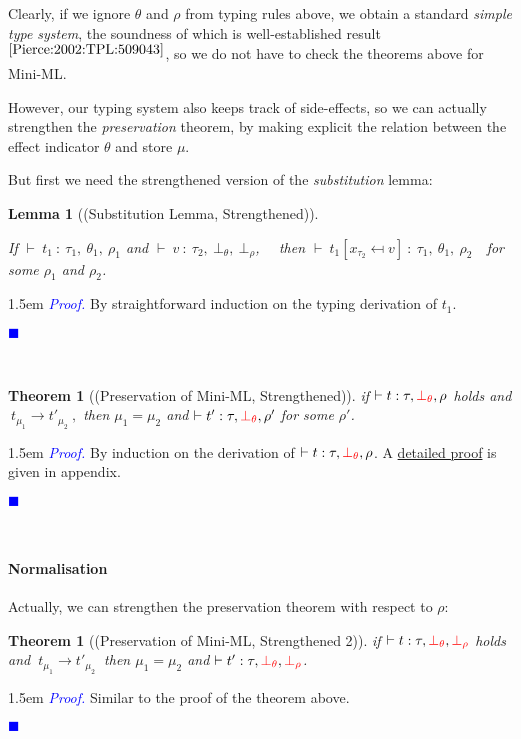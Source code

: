 \documentclass[a4paper,11pt,oneside]{article}
\theoremstyle{plain}
\newtheorem{lemma}[definition]{Lemma}
\newtheorem{theorem}[definition]{Theorem}
\renewenvironment{proof}{\noindent \begin{adjustwidth}{1.5em}{} \textcolor{blue}{\textit{Proof.}}}
{{\begin{tiny}\textcolor{blue}{$\blacksquare$}\end{tiny}}
\end{adjustwidth}~\\\noindent}
\newcommand{\typing}[4]{\vdash~#1~:~#2,~#3,~#4}
\newcommand{\bth}{\bot_\theta}
\newcommand{\brh}{\bot_\rho}
\newcommand{\evalstep}[4]{~#1_{\mu_#2} \rightarrow #3_{\mu_#4} ~}
\begin{document}
 Clearly, if we ignore $\theta$ and $\rho$ from typing rules above, we obtain a standard \textit{simple type system}, the soundness of which is well-established result{\footnotesize$^{ \cite[p.~190]{Pierce:2002:TPL:509043}}$}, so we do not have to check the theorems above for Mini-ML. 
 
 However, our typing system also keeps track of side-effects, so we can actually strengthen the \textit{preservation} theorem, by making explicit the relation between the effect indicator $\theta$  and store $\mu$.
 
 But first we need the strengthened version of the \textit{substitution} lemma:
 \begin{lemma}[(Substitution Lemma, Strengthened)] ~ 
 \hypertarget{subst-lemma}{}
\label{subst-lemma}

%

If $\typing{t_1}{\tau_1}{\theta_1}{\rho_1}$ and $\typing{v}{\tau_2}{\bth}{\brh}$, ~~then $\typing{t_1[x_{\tau_2} \mapsfrom v]}{\tau_1}{\theta_1}{\rho_2}$~~for some $\rho_1$ and $\rho_2$. 

\end{lemma}
\begin{proof}
  By straightforward induction on the typing derivation of $t_1$.
\end{proof}
 
\begin{theorem}[(Preservation of Mini-ML, Strengthened)] 
if $\vdash t : \tau, \textcolor{red}{\bth}, \rho$ holds and $\evalstep{t}{1}{t'}{2},$ then $\mu_1 = \mu_2$ and $\vdash t' : \tau, \textcolor{red}{\bth}, \rho'$ for some $\rho'$.
\label{preserv-prop-d}
\end{theorem}
\begin{proof}
  By induction on the derivation of $\vdash t : \tau, \textcolor{red}{\bth}, \rho$.
  A \hyperlink{proof:preserv-prop-p}{detailed proof} is given in appendix. 
\end{proof}
\paragraph{Normalisation}

Actually, we can strengthen the preservation theorem with respect to $\rho$:
\begin{theorem}[(Preservation of Mini-ML, Strengthened 2)] 
if $\vdash t : \tau, \textcolor{red}{\bth}, \textcolor{red}{\brh}$ holds and $\evalstep{t}{1}{t'}{2}$ then $\mu_1 = \mu_2$ and $\vdash t' : \tau, \textcolor{red}{\bth}, \textcolor{red}{\brh}$.
\label{preserv-prop2-d}
\end{theorem}
\begin{proof}
  Similar to the proof of the theorem above.
\end{proof}
\end{document}
